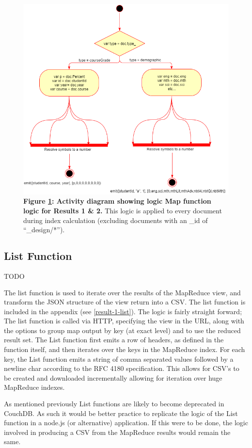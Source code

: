 \begin{figure}[ht]
    \centering
    \begin{mdframed}
        \centering
        \includegraphics[scale=0.35]{./resources/figures/activity-diagram-1.png}
    \end{mdframed}
    \caption[Result 1 Map function]{\textbf{Figure \ref{result-1-map-fn}: Activity diagram showing logic Map function logic for Results 1 \& 2.} This logic is applied to every document during index calculation (excluding documents with an \_id of ``\_design/*'').}
    \label{result-1-map-fn}
\end{figure}

\subsection{List Function}
TODO

The list function is used to iterate over the results of the MapReduce view, and transform the JSON structure of the view return into a CSV. The list function is included in the appendix (see \ref{result-1-list}). The logic is fairly straight forward; The list function is called via HTTP, specifying the view in the URL, along with the options to group map output by key (at exact level) and to use the reduced result set. The List function first emits a row of headers, as defined in the function itself, and then iterates over the keys in the MapReduce index. For each key, the List function emits a string of comma separated values followed by a newline char according to the RFC 4180 specification. This allows for CSV's to be created and downloaded incrementally allowing for iteration over huge MapReduce indexes.

As mentioned previously List functions are likely to become deprecated in CouchDB. As such it would be better practice to replicate the logic of the List function in a node.js (or alternative) application. If this were to be done, the logic involved in producing a CSV from the MapReduce results would remain the same.